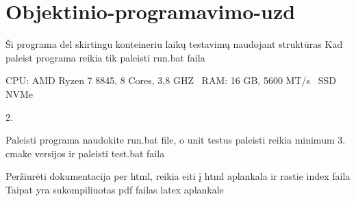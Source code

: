\chapter{Objektinio-\/programavimo-\/uzd}
\hypertarget{md__r_e_a_d_m_e}{}\label{md__r_e_a_d_m_e}
\label{md__r_e_a_d_m_e_autotoc_md0}%
%


Ši programa del skirtingu konteineriu laikų testavimų naudojant struktūras Kad paleist programa reikia tik paleisti run.\+bat faila

CPU\+: AMD Ryzen 7 8845, 8 Cores, 3,8 GHZ~\newline
 RAM\+: 16 GB, 5600 MT/s~\newline
 SSD NVMe ~\newline


2.

Paleisti programa naudokite run.\+bat file, o unit testus paleisti reikia minimum 3. cmake versijos ir paleisti test.\+bat faila

Peržiurėti dokumentacija per html, reikia eiti į html aplankala ir rastie index faila Taipat yra sukompiliuotas pdf failas latex aplankale 